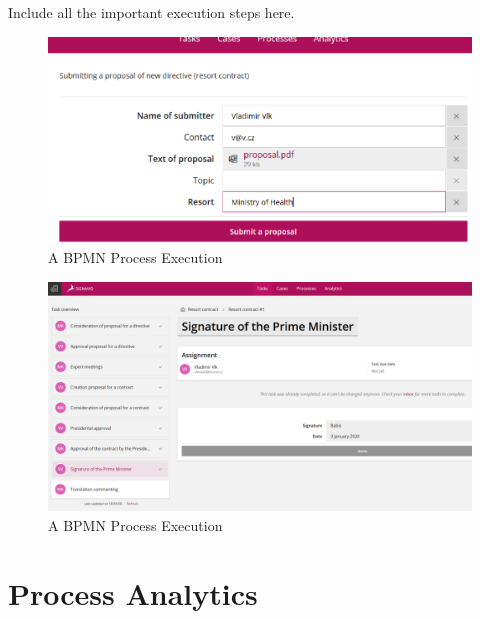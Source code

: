 Include all the important execution steps here. 

\begin{figure}[h]\centering
	\includegraphics[width=\textwidth]{pic/BPMNExecution1}
	\caption{A BPMN Process Execution~\cite{kutisvlk2019}}
	\label{fig:bpmnExecution1}
\end{figure}

\begin{figure}[h]\centering
	\includegraphics[width=\textwidth]{pic/BPMNExecution2}
	\caption{A BPMN Process Execution~\cite{kutisvlk2019}}
	\label{fig:bpmnExecution2}
\end{figure}

\section{Process Analytics}

